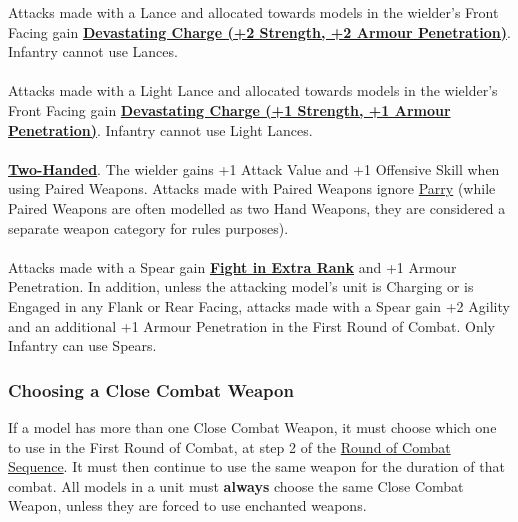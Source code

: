 Attacks made with a Lance and allocated towards models in the wielder's Front Facing gain \hyperref[devastating_charge]{\textbf{Devastating Charge (+2 Strength, +2 Armour Penetration)}}. Infantry cannot use Lances.

\paragraph{\lightlance}
\idx[main=y]{\lightlance}

Attacks made with a Light Lance and allocated towards models in the wielder's Front Facing gain \hyperref[devastating_charge]{\textbf{Devastating Charge (+1 Strength, +1 Armour Penetration)}}. Infantry cannot use Light Lances.

\paragraph{\pw}
\idx[main=y]{\pw}

\hyperref[twohanded]{\textbf{Two-Handed}}. The wielder gains +1 Attack Value and +1 Offensive Skill when using Paired Weapons. Attacks made with Paired Weapons ignore \hyperref[parry]{Parry} (while Paired Weapons are often modelled as two Hand Weapons, they are considered a separate weapon category for rules purposes).

\paragraph{\spear}
\idx[main=y]{\spear}

Attacks made with a Spear gain \hyperref[fight_in_extra_rank]{\textbf{Fight in Extra Rank}} and +1 Armour Penetration. In addition, unless the attacking model’s unit is Charging or is Engaged in any Flank or Rear Facing, attacks made with a Spear gain +2 Agility and an additional +1 Armour Penetration in the First Round of Combat. Only Infantry can use Spears.

\subsubsection{Choosing a Close Combat Weapon}

If a model has more than one Close Combat Weapon, it must choose which one to use in the First Round of Combat, at step 2 of the \hyperref[round_of_combat_sequence]{Round of Combat Sequence}. It must then continue to use the same weapon for the duration of that combat. All \rnf{} models in a unit must \textbf{always} choose the same Close Combat Weapon, unless they are forced to use enchanted weapons.

